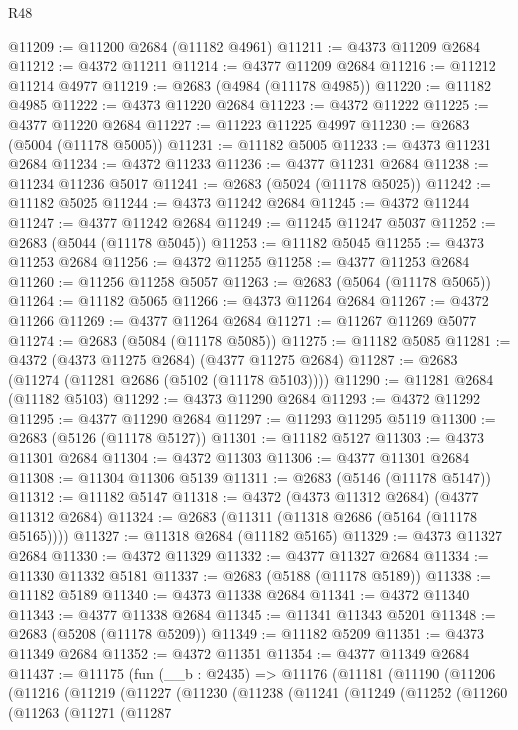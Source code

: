 \begin{lexlean}{R48}
\begin{coremodule}
@11209 := @11200 @2684 (@11182 @4961)
@11211 := @4373 @11209 @2684
@11212 := @4372 @11211
@11214 := @4377 @11209 @2684
@11216 := @11212 @11214 @4977
@11219 := @2683 (@4984 (@11178 @4985))
@11220 := @11182 @4985
@11222 := @4373 @11220 @2684
@11223 := @4372 @11222
@11225 := @4377 @11220 @2684
@11227 := @11223 @11225 @4997
@11230 := @2683 (@5004 (@11178 @5005))
@11231 := @11182 @5005
@11233 := @4373 @11231 @2684
@11234 := @4372 @11233
@11236 := @4377 @11231 @2684
@11238 := @11234 @11236 @5017
@11241 := @2683 (@5024 (@11178 @5025))
@11242 := @11182 @5025
@11244 := @4373 @11242 @2684
@11245 := @4372 @11244
@11247 := @4377 @11242 @2684
@11249 := @11245 @11247 @5037
@11252 := @2683 (@5044 (@11178 @5045))
@11253 := @11182 @5045
@11255 := @4373 @11253 @2684
@11256 := @4372 @11255
@11258 := @4377 @11253 @2684
@11260 := @11256 @11258 @5057
@11263 := @2683 (@5064 (@11178 @5065))
@11264 := @11182 @5065
@11266 := @4373 @11264 @2684
@11267 := @4372 @11266
@11269 := @4377 @11264 @2684
@11271 := @11267 @11269 @5077
@11274 := @2683 (@5084 (@11178 @5085))
@11275 := @11182 @5085
@11281 := @4372 (@4373 @11275 @2684) (@4377 @11275 @2684)
@11287 := @2683 (@11274 (@11281 @2686 (@5102 (@11178 @5103))))
@11290 := @11281 @2684 (@11182 @5103)
@11292 := @4373 @11290 @2684
@11293 := @4372 @11292
@11295 := @4377 @11290 @2684
@11297 := @11293 @11295 @5119
@11300 := @2683 (@5126 (@11178 @5127))
@11301 := @11182 @5127
@11303 := @4373 @11301 @2684
@11304 := @4372 @11303
@11306 := @4377 @11301 @2684
@11308 := @11304 @11306 @5139
@11311 := @2683 (@5146 (@11178 @5147))
@11312 := @11182 @5147
@11318 := @4372 (@4373 @11312 @2684) (@4377 @11312 @2684)
@11324 := @2683 (@11311 (@11318 @2686 (@5164 (@11178 @5165))))
@11327 := @11318 @2684 (@11182 @5165)
@11329 := @4373 @11327 @2684
@11330 := @4372 @11329
@11332 := @4377 @11327 @2684
@11334 := @11330 @11332 @5181
@11337 := @2683 (@5188 (@11178 @5189))
@11338 := @11182 @5189
@11340 := @4373 @11338 @2684
@11341 := @4372 @11340
@11343 := @4377 @11338 @2684
@11345 := @11341 @11343 @5201
@11348 := @2683 (@5208 (@11178 @5209))
@11349 := @11182 @5209
@11351 := @4373 @11349 @2684
@11352 := @4372 @11351
@11354 := @4377 @11349 @2684
@11437 := @11175
    (fun (__b : @2435) =>
    @11176
      (@11181
        (@11190
          (@11206
            (@11216
              (@11219
                (@11227
                  (@11230
                    (@11238
                      (@11241
                        (@11249
                          (@11252
                            (@11260
                              (@11263
                                (@11271
                                  (@11287

\end{coremodule}
\end{lexlean}
